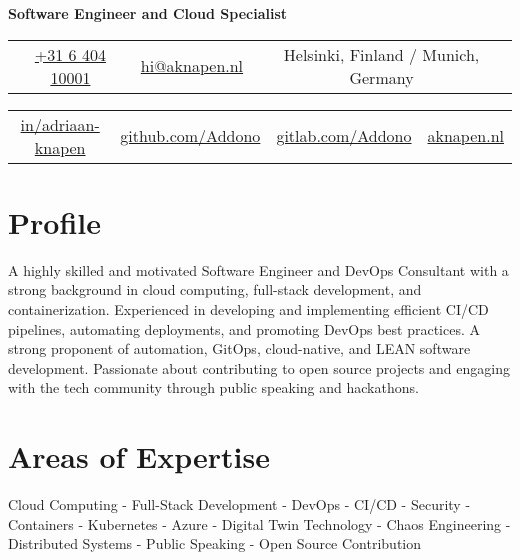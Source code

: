 \documentclass[11pt,a4paper,sans]{moderncv}
\begin{document}
\makecvtitle


\vspace*{-18mm}
\begin{center}\textbf{Software Engineer and Cloud Specialist}\end{center}

\begin{center}
	\begin{tabular}{ c c c }
		\faMobile\enspace 
		\href{tel:+31640410001}{+31 6 404 10001}
		\enspace & \enspace 
		\href{mailto:hi@aknapen.nl}{hi@aknapen.nl}
		\enspace & \enspace 
		\faHome\enspace Helsinki, Finland / Munich, Germany
	\end{tabular}
			
	\begin{tabular}{ c c c c }
		\faLinkedin\enspace \color{blue} \href{https://www.linkedin.com/in/adriaan-knapen/}{in/adriaan-knapen} &
		\enspace\enspace\faGithub\enspace \color{blue} \href{https://github.com/Addono}{github.com/Addono} & \enspace\enspace\faGitlab\enspace \color{blue} \href{https://gitlab.com/Addono}{gitlab.com/Addono} & \enspace\enspace\faHome\enspace \color{blue} \href{https://aknapen.nl}{aknapen.nl} 
	\end{tabular}
\end{center}

\section{Profile}
{A highly skilled and motivated Software Engineer and DevOps Consultant with a strong background in cloud computing, full-stack development, and containerization. Experienced in developing and implementing efficient CI/CD pipelines, automating deployments, and promoting DevOps best practices. A strong proponent of automation, GitOps, cloud-native, and LEAN software development. Passionate about contributing to open source projects and engaging with the tech community through public speaking and hackathons.}

\section{Areas of Expertise}
{Cloud Computing - Full-Stack Development - DevOps - CI/CD - Security - Containers - Kubernetes - Azure -  Digital Twin Technology - Chaos Engineering - Distributed Systems - Public Speaking - Open Source Contribution}
\end{document}
